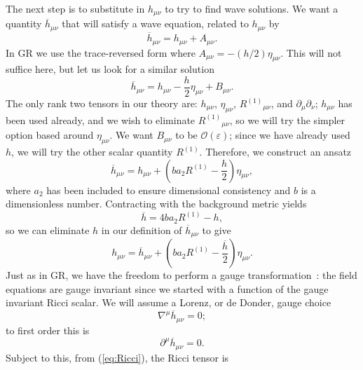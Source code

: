\documentclass[aps,prd,amsfonts,amssymb,amsmath,nofootinbib,reprint,showpacs]{revtex4-1}
\newcommand{\eqnref}[1]{(\ref{eq:#1})}
\newcommand{\order}[1]{\ensuremath{\mathcal{O}({#1})}}
\begin{document}
The next step is to substitute in $h_{\mu\nu}$ to try to find wave solutions. We want a quantity $\overline{h}_{\mu\nu}$ that will satisfy a wave equation, related to $h_{\mu\nu}$ by
\begin{equation}
\overline{h}_{\mu\nu} = h_{\mu\nu} + A_{\mu\nu}.
\end{equation}
In GR we use the trace-reversed form where $A_{\mu\nu} = -(h/2)\eta_{\mu\nu}$. This will not suffice here, but let us look for a similar solution
\begin{equation}
\overline{h}_{\mu\nu} = h_{\mu\nu} - \frac{h}{2}\eta_{\mu\nu} + B_{\mu\nu}.
\end{equation}
The only rank two tensors in our theory are: $h_{\mu\nu}$, $\eta_{\mu\nu}$, ${R^{(1)}}_{\mu\nu}$, and $\partial_\mu\partial_\nu$; $h_{\mu\nu}$ has been used already, and we wish to eliminate ${R^{(1)}}_{\mu\nu}$, so we will try the simpler option based around $\eta_{\mu\nu}$. We want $B_{\mu\nu}$ to be $\order{\varepsilon}$; since we have already used $h$, we will try the other scalar quantity $R^{(1)}$. Therefore, we construct an ansatz
\begin{equation}
\overline{h}_{\mu\nu} = h_{\mu\nu} + \left(b a_2 R^{(1)} - \frac{h}{2}\right)\eta_{\mu\nu},
\label{eq:Ansatz}
\end{equation}
where $a_2$ has been included to ensure dimensional consistency and $b$ is a dimensionless number. Contracting with the background metric yields
\begin{equation}
\overline{h} = 4b a_2 R^{(1)} - h,
\label{eq:h_trace}
\end{equation}
so we can eliminate $h$ in our definition of $\overline{h}_{\mu\nu}$ to give
\begin{equation}
h_{\mu\nu} = \overline{h}_{\mu\nu} + \left(b a_2 R^{(1)} -\frac{\overline{h}}{2}\right)\eta_{\mu\nu}.
\end{equation}
Just as in GR, we have the freedom to perform a gauge transformation~\cite{Misner1973, Hobson2006}: the field equations are gauge invariant since we started with a function of the gauge invariant Ricci scalar. We will assume a Lorenz, or de Donder, gauge choice
\begin{equation}
\nabla^\mu \overline{h}_{\mu\nu} = 0;
\label{eq:Lorenz}
\end{equation}
to first order this is
\begin{equation}
\partial^\mu \overline{h}_{\mu\nu} = 0.
\end{equation}
Subject to this, from \eqnref{Ricci}, the Ricci tensor is
\end{document}
